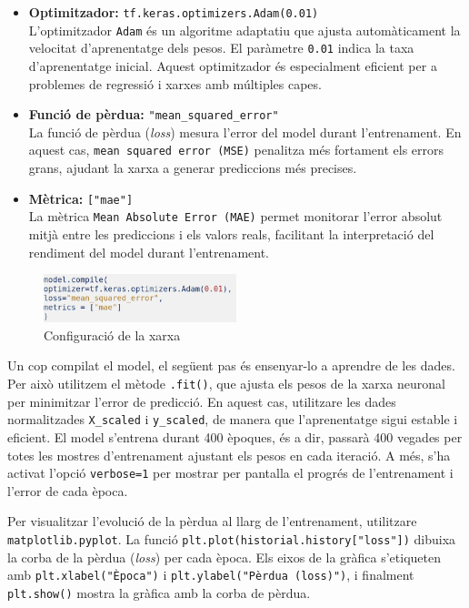 \begin{itemize}
    \item \textbf{Optimitzador:} \texttt{tf.keras.optimizers.Adam(0.01)} \\
    L’optimitzador \texttt{Adam} és un algoritme adaptatiu que ajusta automàticament la velocitat d’aprenentatge dels pesos. El paràmetre \texttt{0.01} indica la taxa d’aprenentatge inicial. Aquest optimitzador és especialment eficient per a problemes de regressió i xarxes amb múltiples capes.

    \item \textbf{Funció de pèrdua:} \texttt{"mean\_squared\_error"} \\
    La funció de pèrdua (\textit{loss}) mesura l’error del model durant l’entrenament. En aquest cas, \texttt{mean squared error (MSE)} penalitza més fortament els errors grans, ajudant la xarxa a generar prediccions més precises.

    \item \textbf{Mètrica:} \texttt{["mae"]} \\
    La mètrica \texttt{Mean Absolute Error (MAE)} permet monitorar l’error absolut mitjà entre les prediccions i els valors reals, facilitant la interpretació del rendiment del model durant l’entrenament.
\end{itemize}

\begin{figure}[H]
    \centering
    \includegraphics[width=0.5\textwidth]{./figures/27.png}
    \caption{Configuració de la xarxa}
\end{figure}

Un cop compilat el model, el següent pas és ensenyar-lo a aprendre de les dades. Per això utilitzem el mètode \texttt{.fit()}, que ajusta els pesos de la xarxa neuronal per minimitzar l’error de predicció. En aquest cas, utilitzare les dades normalitzades \texttt{X\_scaled} i \texttt{y\_scaled}, de manera que l’aprenentatge sigui estable i eficient. El model s’entrena durant 400 èpoques, és a dir, passarà 400 vegades per totes les mostres d’entrenament ajustant els pesos en cada iteració. A més, s’ha activat l’opció \texttt{verbose=1} per mostrar per pantalla el progrés de l’entrenament i l’error de cada època.

Per visualitzar l’evolució de la pèrdua al llarg de l’entrenament, utilitzare \texttt{matplotlib.pyplot}. La funció \texttt{plt.plot(historial.history["loss"])} dibuixa la corba de la pèrdua (\textit{loss}) per cada època. Els eixos de la gràfica s’etiqueten amb \texttt{plt.xlabel("Època")} i \texttt{plt.ylabel("Pèrdua (loss)")}, i finalment \texttt{plt.show()} mostra la gràfica amb la corba de pèrdua.

